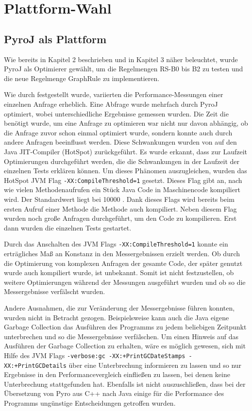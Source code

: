 \section{Plattform-Wahl}

\subsection{PyroJ als Plattform}

Wie bereits in Kapitel 2 beschrieben und in Kapitel 3 näher beleuchtet, wurde PyroJ als Optimierer gewählt, um die Regelmengen RS-B0 bis B2 zu testen und die neue Regelmenge GraphRule zu implementieren.

Wie durch \cite{shanbhag2014optimizing} festgestellt wurde, variierten die Performance-Messungen einer einzelnen Anfrage erheblich. Eine Abfrage wurde mehrfach durch PyroJ optimiert, wobei unterschiedliche Ergebnisse gemessen wurden. Die Zeit die benötigt wurde, um eine Anfrage zu optimieren war nicht nur davon abhängig, ob die Anfrage zuvor schon einmal optimiert wurde, sondern konnte auch durch andere Anfragen beeinflusst werden. Diese Schwankungen wurden von \cite{shanbhag2014optimizing} auf den Java JIT-Compiler (HotSpot) zurückgeführt. Es wurde erkannt, dass zur Laufzeit Optimierungen durchgeführt werden, die die Schwankungen in der Laufzeit der einzelnen Tests erklären können. Um dieses Phänomen auszugleichen, wurden das HotSpot JVM Flag \texttt{-XX:CompileThreshold=1} gesetzt. Dieses Flag gibt an, nach wie vielen Methodenaufrufen ein Stück Java Code in Maschinencode kompiliert wird. Der Standardwert liegt bei 10000 \cite{oracle2015VMOptions}. Dank dieses Flags wird bereits beim ersten Aufruf einer Methode die Methode auch kompiliert. Neben diesem Flag wurden noch große Anfragen durchgeführt, um den Code zu kompilieren. Erst dann wurden die einzelnen Tests gestartet.


Durch das Anschalten des JVM Flags \texttt{-XX:CompileThreshold=1} konnte ein erträgliches Maß an Konstanz in den Messergebnissen erzielt werden. Ob durch die Optimierung von komplexen Anfragen der gesamte Code, der später genutzt wurde auch kompiliert wurde, ist unbekannt. Somit ist nicht festzustellen, ob weitere Optimierungen während der Messungen ausgeführt wurden und ob so die Messergebnisse verfälscht wurden.

Andere Ausnahmen, die zur Veränderung der Messergebnisse führen konnten, wurden nicht in Betracht gezogen. Beispielsweise kann auch die Java eigene  Garbage Collection das Ausführen des Programms zu jedem beliebigen Zeitpunkt unterbrechen und so die Messergebnisse verfälschen. Um einen Hinweis auf das Ausführen der Garbage Collection zu erhalten, wäre es möglich gewesen, sich mit Hilfe des  JVM Flags \texttt{-verbose:gc -XX:+PrintGCDateStamps -XX:+PrintGCDetails} über eine Unterbrechung informieren zu lassen  \cite{andreasson2015JVM}  und so nur Ergebnisse in den Performancevergleich einfließen zu lassen, bei denen keine Unterbrechung stattgefunden hat. Ebenfalls ist nicht auszuschließen, dass bei der Übersetzung von Pyro aus C++ nach Java einige für die Performance des Programms ungünstige Entscheidungen getroffen wurden. 




